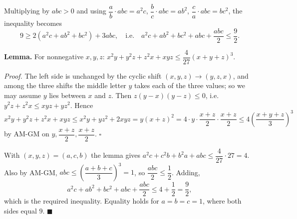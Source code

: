 Multiplying by $abc>0$ and using $\dfrac {a}{b}\cdot abc=a^2c$, $\dfrac {b}{c}\cdot abc=ab^2$, $\dfrac {c}{a}\cdot abc=bc^2$, the inequality becomes
\[
9\ge2\left(a^2c+ab^2+bc^2\right)+3abc,\quad\text{i.e.}\quad a^2c+ab^2+bc^2+abc+\dfrac{abc}{2}\le\dfrac{9}{2} .
\]

\textbf{Lemma.} For nonnegative $x,y,z$: $x^2y+y^2z+z^2x+xyz\le\dfrac{4}{27}(x+y+z)^3$.

\emph{Proof.} The left side is unchanged by the cyclic shift $(x,y,z)\to(y,z,x)$, and among the three shifts the middle letter $y$ takes each of the three values; so we may assume $y$ lies between $x$ and $z$. Then $z(y-x)(y-z)\le0$, i.e.\ $y^2z+z^2x\le xyz+yz^2$. Hence
\[
x^2y+y^2z+z^2x+xyz\le x^2y+yz^2+2xyz=y(x+z)^2=4\cdot y\cdot\dfrac{x+z}{2}\cdot\dfrac{x+z}{2}\le4\left(\dfrac{x+y+z}{3}\right)^3
\]
by AM-GM on $y,\dfrac{x+z}{2},\dfrac{x+z}{2}$. $\square$

With $(x,y,z)=(a,c,b)$ the lemma gives $a^2c+c^2b+b^2a+abc\le\dfrac{4}{27}\cdot27=4$. Also by AM-GM, $abc\le\left(\dfrac{a+b+c}{3}\right)^3=1$, so $\dfrac{abc}{2}\le\dfrac{1}{2}$. Adding,
\[
a^2c+ab^2+bc^2+abc+\dfrac{abc}{2}\le4+\dfrac{1}{2}=\dfrac{9}{2},
\]
which is the required inequality. Equality holds for $a=b=c=1$, where both sides equal $9$. $\blacksquare$
